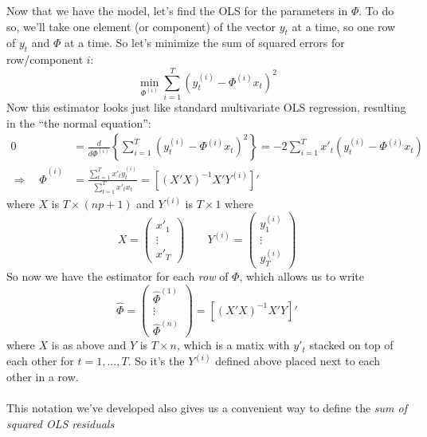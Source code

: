 \documentclass[a4paper,12pt]{scrartcl}
\begin{document}
Now that we have the model, let's find the OLS for 
the parameters in $\Phi$. To do so, we'll take one element (or
component) of the vector $y_t$ at a time, so one row of $y_t$
and $\Phi$ at a time. So let's minimize the sum of
squared errors for row/component $i$: 
\begin{equation}
    \min_{\Phi^{(i)}} \sum^T_{i=1} 
	\left(y_t^{(i)} - \Phi^{(i)} x_t\right)^2
\end{equation}
Now this estimator looks just like standard multivariate OLS 
regression, resulting in the ``the normal equation'':
\begin{align*}
    0 &= \frac{d}{d\Phi^{(i)}}\left\{ \sum^T_{i=1} 
	\left(y_t^{(i)} - \Phi^{(i)} x_t\right)^2\right\} 
	= -2 \sum^T_{i=1} x'_t
	\left(y_t^{(i)} - \Phi^{(i)} x_t\right) \\
    \Rightarrow \quad \hat{\Phi}^{(i)}  &= 
	\frac{\sum^T_{t=1} x'_t y_t^{(i)} }{\sum^T_{t=1} x'_t x_t}
	= \left[(X' X)^{-1} X' Y^{(i)}\right]'
\end{align*}
where $X$ is $T \times (np+1)$ and $Y^{(i)}$ is $T \times 1$
where
\begin{equation}
    \label{xy}
     X = \begin{pmatrix} x'_1 \\ \vdots \\ x'_T \end{pmatrix}
	\qquad Y^{(i)} = \begin{pmatrix} y_1^{(i)}  \\
	\vdots \\ y_T^{(i)} \end{pmatrix} 
\end{equation}
So now we have the estimator for each \emph{row}
of $\Phi$, which allows us to write
\begin{equation}
    \label{normaleqn}
    \hat{\Phi} = \begin{pmatrix} \hat{\Phi}^{(1)} \\ \vdots \\
	\hat{\Phi}^{(n)} \end{pmatrix}  
	= \left[(X' X)^{-1} X' Y\right]'
\end{equation}
where $X$ is as above and $Y$ is $T \times n$, which is 
a matix with $y'_t$ stacked on top of each other for
$t = 1, \ldots, T$.  So it's the $Y^{(i)}$ defined
above placed next to each other in a row.
\\
\\
This notation we've developed also gives us a convenient
way to define the \emph{sum of squared OLS residuals}
\end{document}
